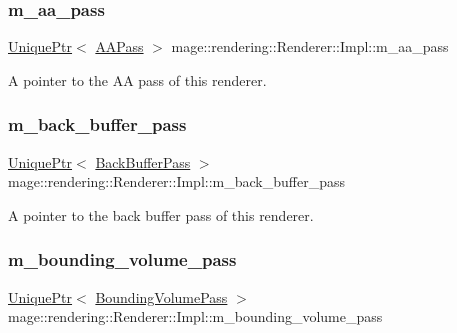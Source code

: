 \subsubsection{\texorpdfstring{m\+\_\+aa\+\_\+pass}{m\_aa\_pass}}
{\footnotesize\ttfamily \hyperlink{namespacemage_a3316d7143a973e37adf1110f2e80ca31}{Unique\+Ptr}$<$ \hyperlink{classmage_1_1rendering_1_1_a_a_pass}{A\+A\+Pass} $>$ mage\+::rendering\+::\+Renderer\+::\+Impl\+::m\+\_\+aa\+\_\+pass\hspace{0.3cm}{\ttfamily [private]}}

A pointer to the AA pass of this renderer. \hypertarget{classmage_1_1rendering_1_1_renderer_1_1_impl_aa030ca4a6167a0dead99172e922ae724}{}\label{classmage_1_1rendering_1_1_renderer_1_1_impl_aa030ca4a6167a0dead99172e922ae724} 
\subsubsection{\texorpdfstring{m\+\_\+back\+\_\+buffer\+\_\+pass}{m\_back\_buffer\_pass}}
{\footnotesize\ttfamily \hyperlink{namespacemage_a3316d7143a973e37adf1110f2e80ca31}{Unique\+Ptr}$<$ \hyperlink{classmage_1_1rendering_1_1_back_buffer_pass}{Back\+Buffer\+Pass} $>$ mage\+::rendering\+::\+Renderer\+::\+Impl\+::m\+\_\+back\+\_\+buffer\+\_\+pass\hspace{0.3cm}{\ttfamily [private]}}

A pointer to the back buffer pass of this renderer. \hypertarget{classmage_1_1rendering_1_1_renderer_1_1_impl_adeb573b3a2780e7c8af6fda3e073f90b}{}\label{classmage_1_1rendering_1_1_renderer_1_1_impl_adeb573b3a2780e7c8af6fda3e073f90b} 
\subsubsection{\texorpdfstring{m\+\_\+bounding\+\_\+volume\+\_\+pass}{m\_bounding\_volume\_pass}}
{\footnotesize\ttfamily \hyperlink{namespacemage_a3316d7143a973e37adf1110f2e80ca31}{Unique\+Ptr}$<$ \hyperlink{classmage_1_1rendering_1_1_bounding_volume_pass}{Bounding\+Volume\+Pass} $>$ mage\+::rendering\+::\+Renderer\+::\+Impl\+::m\+\_\+bounding\+\_\+volume\+\_\+pass\hspace{0.3cm}{\ttfamily [private]}}

